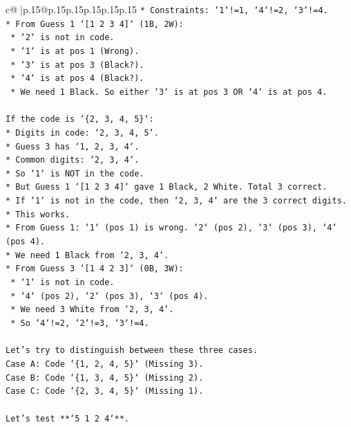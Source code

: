 \documentclass{article}
\begin{document}
{\begin{supertabular}{c@{$\;$}|p{.15\linewidth}@{}p{.15\linewidth}p{.15\linewidth}p{.15\linewidth}p{.15\linewidth}p{.15\linewidth}}
{{{\texttt{*   Constraints: `1`!=1, `4`!=2, `3`!=4.} \\
\texttt{*   From Guess 1 `{[}1 2 3 4{]}` (1B, 2W):} \\
\texttt{    *   `2` is not in code.} \\
\texttt{    *   `1` is at pos 1 (Wrong).} \\
\texttt{    *   `3` is at pos 3 (Black?).} \\
\texttt{    *   `4` is at pos 4 (Black?).} \\
\texttt{    *   We need 1 Black. So either `3` is at pos 3 OR `4` is at pos 4.} \\
\\ 
\texttt{If the code is `\{2, 3, 4, 5\}`:} \\
\texttt{*   Digits in code: `2, 3, 4, 5`.} \\
\texttt{*   Guess 3 has `1, 2, 3, 4`.} \\
\texttt{*   Common digits: `2, 3, 4`.} \\
\texttt{*   So `1` is NOT in the code.} \\
\texttt{*   But Guess 1 `{[}1 2 3 4{]}` gave 1 Black, 2 White. Total 3 correct.} \\
\texttt{*   If `1` is not in the code, then `2, 3, 4` are the 3 correct digits.} \\
\texttt{*   This works.} \\
\texttt{*   From Guess 1: `1` (pos 1) is wrong. `2` (pos 2), `3` (pos 3), `4` (pos 4).} \\
\texttt{*   We need 1 Black from `2, 3, 4`.} \\
\texttt{*   From Guess 3 `{[}1 4 2 3{]}` (0B, 3W):} \\
\texttt{    *   `1` is not in code.} \\
\texttt{    *   `4` (pos 2), `2` (pos 3), `3` (pos 4).} \\
\texttt{    *   We need 3 White from `2, 3, 4`.} \\
\texttt{    *   So `4`!=2, `2`!=3, `3`!=4.} \\
\\ 
\texttt{Let's try to distinguish between these three cases.} \\
\texttt{Case A: Code `\{1, 2, 4, 5\}` (Missing 3).} \\
\texttt{Case B: Code `\{1, 3, 4, 5\}` (Missing 2).} \\
\texttt{Case C: Code `\{2, 3, 4, 5\}` (Missing 1).} \\
\\ 
\texttt{Let's test **`5 1 2 4`**.} \\
}}}
\end{supertabular}}
\end{document}
